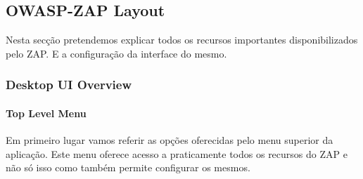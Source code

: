 \subsection{OWASP-ZAP Layout}

Nesta secção pretendemos explicar todos os recursos importantes disponibilizados pelo ZAP. E a configuração da interface do mesmo.


\subsubsection{Desktop UI Overview}

\paragraph{Top Level Menu}

Em primeiro lugar vamos referir as opções oferecidas pelo menu superior da aplicação. Este menu oferece acesso a praticamente todos os recursos do ZAP e não só isso como também permite configurar os mesmos.

